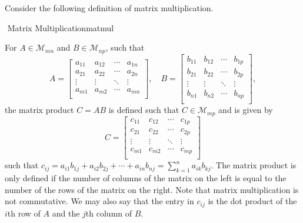         Consider the following definition of matrix multiplication.
        \begin{definition}{\Stop\,\,Matrix Multiplication}{matmul}
        
            For \(A\in\mathcal{M}_{mn}\) and \(B\in\mathcal{M}_{np}\), such that
            \begin{equation*}
                A=\begin{bmatrix} 
                     a_{11} &  a_{12} & \cdots &  a_{1n} \\
                     a_{21} &  a_{22} & \cdots &  a_{2n} \\
                    \vdots & \vdots & \ddots & \vdots \\
                     a_{m1} &  a_{m2} & \cdots &  a_{mn} \\
                \end{bmatrix},\quad
                B=\begin{bmatrix} 
                     b_{11} &  b_{12} & \cdots &  b_{1p} \\
                     b_{21} &  b_{22} & \cdots &  b_{2p} \\
                    \vdots & \vdots & \ddots & \vdots \\
                     b_{n1} &  b_{n2} & \cdots &  b_{np} \\
                \end{bmatrix},
            \end{equation*}
            the matrix product \(C=AB\) is defined such that \(C\in\mathcal{M}_{mp}\) and is given by
            \begin{equation*}
                C=\begin{bmatrix} 
                     c_{11} &  c_{12} & \cdots &  c_{1p} \\
                     c_{21} &  c_{22} & \cdots &  c_{2p} \\
                    \vdots & \vdots & \ddots & \vdots \\
                     c_{m1} &  c_{m2} & \cdots &  c_{mp} \\
                \end{bmatrix}
            \end{equation*}
            such that \(c_{ij}=a_{i1}b_{1j}+a_{i2}b_{2j}+\cdots+a_{in}b_{nj}=\sum_{k=1}^na_{ik}b_{kj}\). The matrix product is only defined if the number of columns of the matrix on the left is equal to the number of the rows of the matrix on the right. Note that matrix multiplication is not commutative. We may also say that the entry in \(c_{ij}\) is the dot product of the \(i\)th row of \(A\) and the \(j\)th column of \(B\).
            
        \end{definition}
